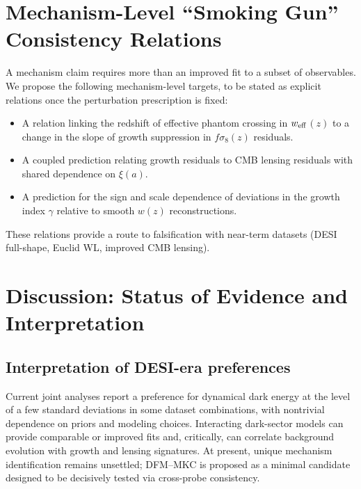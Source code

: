\documentclass[11pt]{article}
\newcommand{\wz}{\ensuremath{w(z)}\xspace}
\newcommand{\weff}{\ensuremath{w_{\rm eff}}\xspace}
\begin{document}
\section{Mechanism-Level ``Smoking Gun'' Consistency Relations}
\label{sec:smokinggun}

A mechanism claim requires more than an improved fit to a subset of observables.
We propose the following mechanism-level targets, to be stated as explicit relations once the perturbation prescription is fixed:

\begin{itemize}
\item A relation linking the redshift of effective phantom crossing in \weff$(z)$ to a change in the slope of growth suppression in $f\sigma_8(z)$ residuals.
\item A coupled prediction relating growth residuals to CMB lensing residuals with shared dependence on $\xi(a)$.
\item A prediction for the sign and scale dependence of deviations in the growth index $\gamma$ relative to smooth \wz reconstructions.
\end{itemize}

These relations provide a route to falsification with near-term datasets (DESI full-shape, Euclid WL, improved CMB lensing).

\section{Discussion: Status of Evidence and Interpretation}
\label{sec:discussion}

\subsection{Interpretation of DESI-era preferences}

Current joint analyses report a preference for dynamical dark energy at the level of a few standard deviations in some dataset combinations, with nontrivial dependence on priors and modeling choices.
Interacting dark-sector models can provide comparable or improved fits and, critically, can correlate background evolution with growth and lensing signatures.
At present, unique mechanism identification remains unsettled; DFM--MKC is proposed as a minimal candidate designed to be decisively tested via cross-probe consistency.
\end{document}
